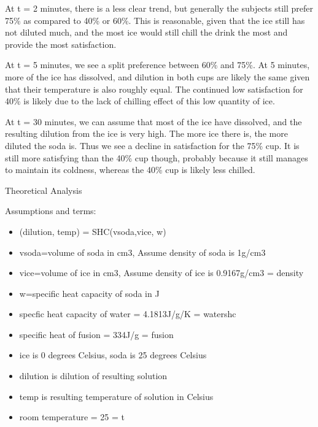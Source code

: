 \documentclass[oneside,12pt]{report}
\begin{document}
\vspace{12pt}
At t = 2 minutes, there is a less clear trend, but generally the subjects still prefer 75\% as compared to 40\% or 60\%. This is reasonable, given that the ice still has not diluted much, and the most ice would still chill the drink the most and provide the most satisfaction. 

\vspace{12pt}
At t = 5 minutes, we see a split preference between 60\% and 75\%. At 5 minutes, more of the ice has dissolved, and dilution in both cups are likely the same given that their temperature is also roughly equal. The continued low satisfaction for 40\% is likely due to the lack of chilling effect of this low quantity of ice.

\vspace{12pt}
At t = 30 minutes, we can assume that most of the ice have dissolved, and the resulting dilution from the ice is very high. The more ice there is, the more diluted the soda is. Thus we see a decline in satisfaction for the 75\% cup. It is still more satisfying than the 40\% cup though, probably because it still manages to maintain its coldness, whereas the 40\% cup is likely less chilled. 

\vspace{24pt}


\newpage
Theoretical Analysis

\vspace{12pt}

Assumptions and terms: 
\begin{itemize}
\item (dilution, temp) = SHC(vsoda,vice, w)
\item vsoda=volume of soda in cm3, Assume density of soda is 1g/cm3
\item vice=volume of ice in cm3, Assume density of ice is 0.9167g/cm3 = density
\item w=specific heat capacity of soda in J
\item specfic heat capacity of water = 4.1813J/g/K = watershc
\item specific heat of fusion = 334J/g = fusion
\item ice is 0 degrees Celsius, soda is 25 degrees Celsius 
\item dilution is dilution of resulting solution
\item temp is resulting temperature of solution in Celsius
\item room temperature = 25 = t
\end{itemize}
\end{document}
